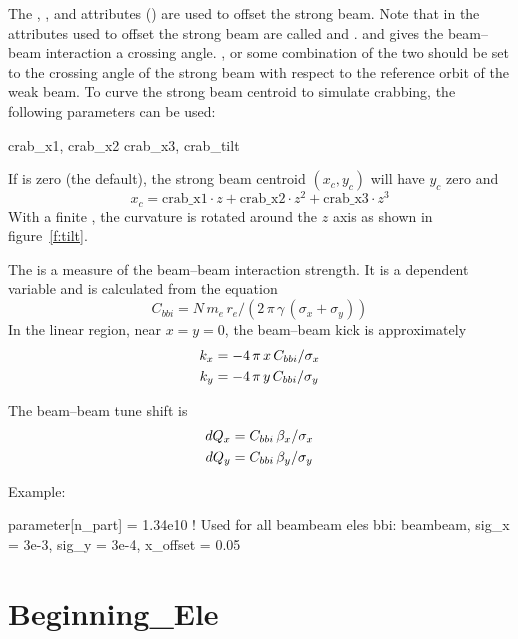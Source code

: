 The , , and  attributes () are used to offset
the strong beam. Note that in \mad the attributes used to offset the strong beam are called 
and .  and  gives the beam--beam interaction a crossing
angle. ,  or some combination of the two should be set to the crossing angle
of the strong beam with respect to the reference orbit of the weak beam. To curve the strong beam centroid to simulate crabbing, the following parameters can be used:
\begin{example}
  crab_x1,    crab_x2
  crab_x3,    crab_tilt
\end{example}
If  is zero (the default), the strong beam centroid $(x_c, y_c)$ will have $y_c$ zero
and
\begin{equation}
  x_c = \text{crab_x1} \cdot z + \text{crab_x2} \cdot z^2 + \text{crab_x3} \cdot z^3
\end{equation}
With a finite , the curvature is rotated around the $z$ axis as shown in
figure~\ref{f:tilt}.

The  is a measure of the beam--beam interaction strength.  It is a dependent
variable and is calculated from the equation
\begin{equation}
  C_{bbi} = N \, m_e \, r_e / (2 \, \pi \, \gamma \, (\sigma_x + \sigma_y))
\end{equation}
In the linear region, near $x = y = 0$, the 
beam--beam kick is approximately 
\begin{align}
  k_x &= -4\, \pi \, x \, C_{bbi} / \sigma_x \nonumber \\
  k_y &= -4\, \pi \, y \, C_{bbi} / \sigma_y 
\end{align}

The beam--beam tune shift is 
\begin{align}
  dQ_x &= C_{bbi} \, \beta_x / \sigma_x \nonumber \\
  dQ_y &= C_{bbi} \, \beta_y / \sigma_y \nonumber \\
\end{align}

Example:
\begin{example}
  parameter[n_part] = 1.34e10     ! Used for all beambeam eles
  bbi: beambeam, sig_x = 3e-3, sig_y = 3e-4, x_offset = 0.05
\end{example}

\section{Beginning_Ele}
\label{s:begin.ele}

